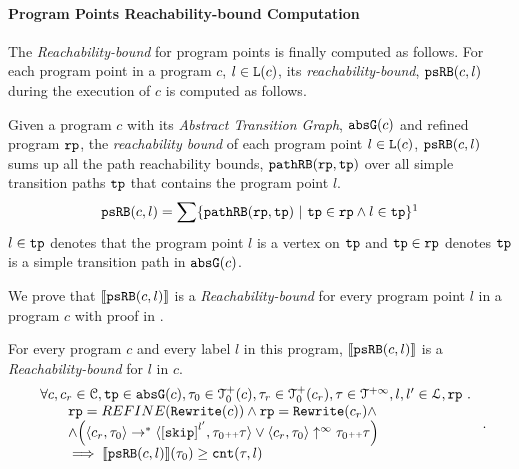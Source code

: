 \paragraph{Program Points Reachability-bound Computation}
\label{sec:point-psrb}
The \emph{Reachability-bound} for program points is finally computed as follows.
For each program point in a program $c$, $l \in \mathtt{L}(c)$,
its \emph{reachability-bound}, $\mathtt{psRB}(c, l)$ during the execution of $c$ is computed as follows.
%
\begin{defn}
  \label{def:point_psrb}
  Given a program $c$ with its \emph{Abstract Transition Graph}, $\mathtt{abs}{\mathtt{G}}(c)$ and refined program $\mathtt{rp}$,
  the \emph{reachability bound} of each program point $l \in \mathtt{L}(c)$, $\mathtt{psRB}(c, l)$ 
  sums up all the path reachability bounds, $\mathtt{pathRB}(\mathtt{rp}, \mathtt{tp})$ over all simple transition paths $\mathtt{tp}$ that contains the program point $l$.
  \[ 
    \psRB(c, l) = 
    \sum
    \left\{ \inoutB(\rprog, \tpath) ~\vert~ \tpath \in \rprog \land 
    l \in \tpath \right\}\footnotemark
  \]
  $l \in \mathtt{tp}$ denotes that the program point $l$ is a vertex on $\mathtt{tp}$ 
  and $\mathtt{tp} \in \mathtt{rp}$ denotes $\mathtt{tp}$ is a simple transition path in $\mathtt{abs}{\mathtt{G}}(c)$.
 \end{defn}
We prove that $\llbracket \mathtt{psRB}(c, l) \rrbracket$ is a \emph{Reachability-bound} for every program point $l$ in a program $c$ with proof in .
\begin{thm}
  \label{thm:pathsensitive_rb_soundness}
  For every program ${c}$ and every label $l$ in this program,
  $\llbracket \mathtt{psRB}(c, l) \rrbracket$ is a \emph{Reachability-bound} for $l$ in $c$.
  \[
    \begin{array}{l}
      \forall c, c_r \in \cdom, \tpath \in \absG(c), \trace_0 \in \ftdom_0(c),  \trace_r \in \ftdom_0(c_r), \trace \in \tdom, l, l' \in \ldom, \rprog \st 
      \\ \qquad
      \rprog = REFINE(\algrewrite(c))
      \land 
      \rprog = \algrewrite(c_r)
      \land
      \\ \qquad
      \land
      \Big(
      \config{c_r, \trace_0} \rightarrow^* \config{\clabel{\eskip}^{l'}, \trace_0 \tracecat \trace}
      \lor \config{c_r, \trace_0} \uparrow^{\infty} \trace_0 \tracecat \trace 
      \Big)
      \\ \qquad
      \implies \econfig{\psRB(c, l)}(\trace_0) \geq \counter(\trace, l)
    \end{array}.
  \]
  \end{thm}